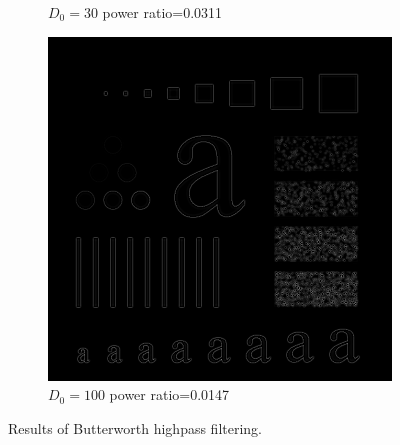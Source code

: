 \begin{figure}[h!]
\begin{subfigure}[b]{0.3\linewidth}
		\caption{$D_0=30$ power ratio=0.0311}
		\label{fig:BHPF_30}
	\end{subfigure}
	\begin{subfigure}[b]{0.3\linewidth}
		\includegraphics[width=\linewidth]{myfigure/p3/BHPF_100.png}
		\caption{$D_0=100$ power ratio=0.0147}
		\label{fig:BHPF_100}
	\end{subfigure}
  	\caption{Results of Butterworth highpass filtering.}
  	\label{fig:BHPF}
\end{figure}

